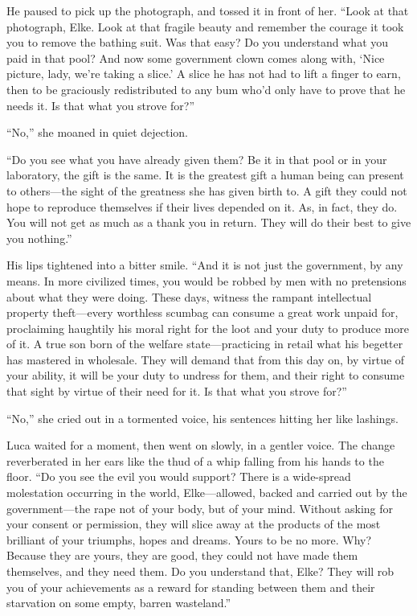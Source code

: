 He paused to pick up the photograph, and tossed it in front of her. ``Look at that photograph, Elke. Look at that fragile beauty and remember the courage it took you to remove the bathing suit. Was that easy? Do you understand what you paid in that pool? And now some government clown comes along with, `Nice picture, lady, we're taking a slice.' A slice he has not had to lift a finger to earn, then to be graciously redistributed to any bum who'd only have to prove that he needs it. Is that what you strove for?''

``No,'' she moaned in quiet dejection.

``Do you see what you have already given them? Be it in that pool or in your laboratory, the gift is the same. It is the greatest gift a human being can present to others---the sight of the greatness she has given birth to. A gift they could not hope to reproduce themselves if their lives depended on it. As, in fact, they do. You will not get as much as a thank you in return. They will do their best to give you nothing.''

His lips tightened into a bitter smile. ``And it is not just the government, by any means. In more civilized times, you would be robbed by men with no pretensions about what they were doing. These days, witness the rampant intellectual property theft---every worthless scumbag can consume a great work unpaid for, proclaiming haughtily his moral right for the loot and your duty to produce more of it. A true son born of the welfare state---practicing in retail what his begetter has mastered in wholesale. They will demand that from this day on, by virtue of your ability, it will be your duty to undress for them, and their right to consume that sight by virtue of their need for it. Is that what you strove for?''

``No,'' she cried out in a tormented voice, his sentences hitting her like lashings.

Luca waited for a moment, then went on slowly, in a gentler voice. The change reverberated in her ears like the thud of a whip falling from his hands to the floor. ``Do you see the evil you would support? There is a wide-spread molestation occurring in the world, Elke---allowed, backed and carried out by the government---the rape not of your body, but of your mind. Without asking for your consent or permission, they will slice away at the products of the most brilliant of your triumphs, hopes and dreams. Yours to be no more. Why? Because they are yours, they are good, they could not have made them themselves, and they need them. Do you understand that, Elke? They will rob you of your achievements as a reward for standing between them and their starvation on some empty, barren wasteland.''

